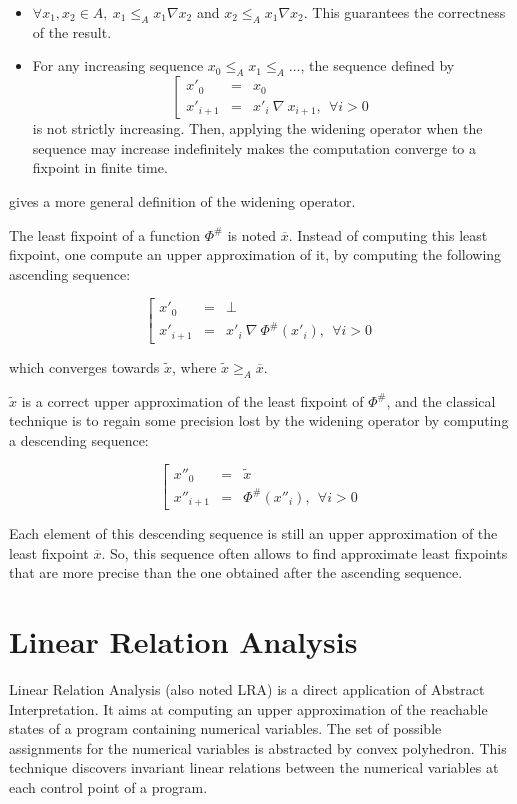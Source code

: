 \documentclass[a4paper,english,titlepage,11pt]{report}
\newcommand*\system[1]{\left[ \begin{array}{lllll}#1 \end{array}\right.}
\begin{document}
\begin{itemize}
\item $\forall x_1, x_2 \in A,\ x_1 \leq_A x_1 \nabla x_2$ and $x_2 \leq_A x_1
\nabla x_2$. This guarantees the correctness of the result.
\item For any increasing sequence $x_0 \leq_A x_1 \leq_A \dots$, the sequence
defined by 
$$\system{
x'_0 & = &  x_0 \\
x'_{i+1} & = &  x'_i\ \nabla\ x_{i+1},\ \  \forall i > 0
}$$
is not strictly increasing. Then, applying the widening operator when the
sequence may increase indefinitely makes the computation converge to a fixpoint
in finite time. 
\end{itemize}

\cite{Monniaux_HOSC09} gives a more general definition of the widening operator.

The least fixpoint of a function $\Phi^\#$ is noted $\overline{x}$.
Instead of computing this least fixpoint,
one compute an upper approximation of it, by computing the following ascending
sequence:

$$\system{
x'_0 &=& \perp \\
x'_{i+1} &=& x'_i\ \nabla\ \Phi^\#(x'_i),\ \ \forall i > 0
}$$

which converges towards $\tilde{x}$, where $\tilde{x} \geq_A \overline{x}$.

$\tilde{x}$ is a correct upper approximation of the least fixpoint of $\Phi^\#$,
and the classical technique is to regain some precision lost by the widening
operator by computing a descending sequence:

$$\system{
x''_0 &=& \tilde{x} \\
x''_{i+1} &=& \Phi^\#(x''_i), \ \ \forall i > 0
}$$

Each element of this descending sequence is still an upper approximation of the
least fixpoint $\overline{x}$. So, this sequence often allows to find
approximate least fixpoints that are more precise than the one obtained after
the ascending sequence.

\section{Linear Relation Analysis}

Linear Relation Analysis \cite{CH78} (also noted LRA) is a direct application of
Abstract Interpretation. It aims at computing an upper approximation of the
reachable states of a program containing numerical variables. The set of
possible assignments for the numerical variables is abstracted by convex
polyhedron. This technique discovers invariant linear relations between
the numerical variables at each control point of a program.
\end{document}
